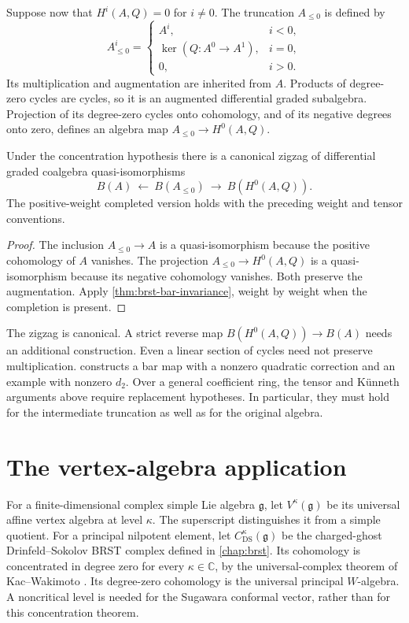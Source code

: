 Suppose now that $H^i(A,Q)=0$ for $i\ne0$.
The truncation $A_{\leq0}$ is defined by
\[
 A_{\leq0}^i=
 \begin{cases}
 A^i,&i<0,\\
 \ker(Q:A^0\to A^1),&i=0,\\
 0,&i>0.
 \end{cases}
\]
Its multiplication and augmentation are inherited from $A$.
Products of degree-zero cycles are cycles, so it is an augmented
differential graded subalgebra.
Projection of its degree-zero cycles onto cohomology, and of its
negative degrees onto zero, defines an algebra map
$A_{\leq0}\to H^0(A,Q)$.

\begin{corollary}
\label{cor:brst-concentrated-reduction}
Under the concentration hypothesis there is a canonical zigzag
of differential graded coalgebra quasi-isomorphisms
\[
 B(A)\ \longleftarrow\ B(A_{\leq0})
 \ \longrightarrow\ B(H^0(A,Q)).
\]
The positive-weight completed version holds with the preceding
weight and tensor conventions.
\end{corollary}
\begin{proof}
The inclusion $A_{\leq0}\to A$ is a quasi-isomorphism because
the positive cohomology of $A$ vanishes.
The projection $A_{\leq0}\to H^0(A,Q)$ is a quasi-isomorphism
because its negative cohomology vanishes.
Both preserve the augmentation.
Apply \cref{thm:brst-bar-invariance}, weight by weight when
the completion is present.
\end{proof}
The zigzag is canonical.  A strict reverse map
$B(H^0(A,Q))\to B(A)$ needs an additional construction.
Even a linear section of cycles need not preserve multiplication.
 constructs a bar map with a nonzero quadratic
correction and an example with nonzero $d_2$.
Over a general coefficient ring, the tensor and K\"unneth
arguments above require replacement hypotheses.
In particular, they must hold for the intermediate truncation
as well as for the original algebra.

\section{The vertex-algebra application}
For a finite-dimensional complex simple Lie algebra $\mathfrak g$,
let $V^\kappa(\mathfrak g)$ be its universal affine vertex algebra
at level $\kappa$.  The superscript distinguishes it from a
simple quotient.
For a principal nilpotent element, let
$C_{\mathrm{DS}}^\kappa(\mathfrak g)$ be the charged-ghost
Drinfeld--Sokolov BRST complex defined in \cref{chap:brst}.
Its cohomology is concentrated in degree zero for every
$\kappa\in\mathbb C$, by the universal-complex theorem of
Kac--Wakimoto \cite[Theorem 4.1]{KacWakimoto2004}.
Its degree-zero cohomology is the universal principal
$W$-algebra.  A noncritical level is needed for the Sugawara
conformal vector, rather than for this concentration theorem.

